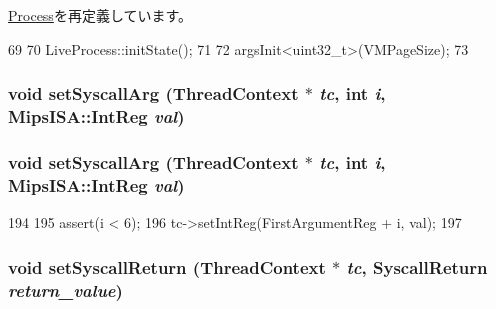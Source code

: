 \hyperlink{classProcess_a3c34ea9b29f410748d4435a667484924}{Process}を再定義しています。


\begin{DoxyCode}
69 {
70     LiveProcess::initState();
71 
72     argsInit<uint32_t>(VMPageSize);
73 }
\end{DoxyCode}
\hypertarget{classMipsLiveProcess_a032ac505186d9587516a73cdc17f4c0d}{
\subsubsection[{setSyscallArg}]{\setlength{\rightskip}{0pt plus 5cm}void setSyscallArg ({\bf ThreadContext} $\ast$ {\em tc}, \/  int {\em i}, \/  {\bf MipsISA::IntReg} {\em val})}}
\label{classMipsLiveProcess_a032ac505186d9587516a73cdc17f4c0d}
\hypertarget{classMipsLiveProcess_a032ac505186d9587516a73cdc17f4c0d}{
\subsubsection[{setSyscallArg}]{\setlength{\rightskip}{0pt plus 5cm}void setSyscallArg ({\bf ThreadContext} $\ast$ {\em tc}, \/  int {\em i}, \/  {\bf MipsISA::IntReg} {\em val})}}
\label{classMipsLiveProcess_a032ac505186d9587516a73cdc17f4c0d}



\begin{DoxyCode}
194 {
195     assert(i < 6);
196     tc->setIntReg(FirstArgumentReg + i, val);
197 }
\end{DoxyCode}
\hypertarget{classMipsLiveProcess_aaefd02663c1eae206b851290d9276a5e}{
\subsubsection[{setSyscallReturn}]{\setlength{\rightskip}{0pt plus 5cm}void setSyscallReturn ({\bf ThreadContext} $\ast$ {\em tc}, \/  {\bf SyscallReturn} {\em return\_\-value})}}
\label{classMipsLiveProcess_aaefd02663c1eae206b851290d9276a5e}


